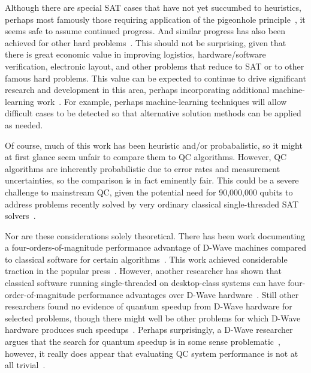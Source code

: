 Although there are special SAT cases that have not yet succumbed to
heuristics, perhaps most famously those requiring application of the
pigeonhole principle~\cite[page~38]{Kroening:2008:DPA:1391237},
it seems safe to assume continued progress.
And similar progress has also been achieved for other hard
problems~\cite{WikipediaPrimalityTest,WikipediaTSP,WikipediaIntegerFactorization}.
This should not be surprising, given that there is great economic value
in improving logistics, hardware/software verification, electronic layout,
and other problems that reduce to SAT or to other famous hard problems.
This value can be expected to continue to drive significant research
and development in this area, perhaps incorporating additional
machine-learning work~\cite{ShaiHaim2009SAT-MachineLearning}.
For example, perhaps machine-learning techniques will allow difficult
cases to be detected so that alternative solution methods can be applied
as needed.

Of course, much of this work has been heuristic and/or probabalistic,
so it might at first glance seem unfair to compare them to
QC algorithms.
However, QC algorithms are inherently probabilistic due to error rates
and measurement uncertainties, so the comparison is in fact eminently
fair.
This could be a severe challenge to mainstream QC, given the potential
need for 90,000,000 qubits to address problems recently solved by
very ordinary classical single-threaded SAT
solvers~\cite{LihaoLiang2016VerifyTreeRCU}.

Nor are these considerations solely theoretical.
There has been work documenting a four-orders-of-magnitude
performance advantage of D-Wave machines compared to classical
software for certain algorithms~\cite{McGeoch:2013:EEA:2482767.2482797}.
This work achieved considerable traction in the popular
press~\cite{CharlesChoi2013D-WaveGoogleNASA}.
However, another researcher has shown that classical software running
single-threaded on desktop-class systems can
have four-order-of-magnitude performance advantages over
D-Wave hardware~\cite{AlexSelby2014D-Wave-vs-classical,AlexSelby2013D-WaveHarderQUBO}.
Still other researchers found no evidence of quantum speedup
from D-Wave hardware for selected problems, though there might well be
other problems for which D-Wave hardware produces such
speedups~\cite{AdrianCho2014QC-D-WaveNoSpeedup,TroelsFRonnow2014QC-D-WaveNoSpeedup}.
Perhaps surprisingly, a D-Wave researcher argues that the search for
quantum speedup is in some sense
problematic~\cite{MohammadHAmin2015QC-D-Wave-QuantumSpeedupProblematic},
however, it really does appear that evaluating QC system performance is
not at all
trivial~\cite{PhysRevLett.118.100601,ArsTechnica2017QC-SpeedTradeoffs}.

